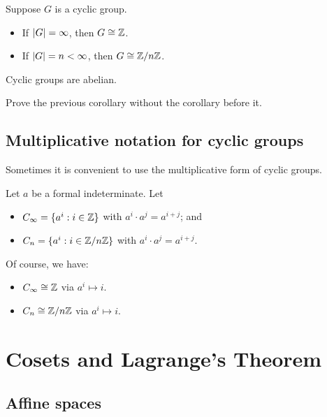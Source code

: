\documentclass[12pt,letterpaper]{report}
\begin{document}
\begin{cor}{}{}
  Suppose $G$ is a cyclic group.
  \begin{itemize}
    \item If $\lvert G\rvert = \infty$, then $G \cong \mathbb{Z}$.
    \item If $\lvert G\rvert = n < \infty$, then $G \cong \mathbb{Z}/{n}\mathbb{Z}$.
  \end{itemize}
\end{cor}

\begin{cor}{}{}
  Cyclic groups are abelian.
\end{cor}

\begin{exer}{}{}
  Prove the previous corollary without the corollary before it.
\end{exer}

\pagebreak
\subsection{Multiplicative notation for cyclic groups}

Sometimes it is convenient to use the multiplicative form of cyclic groups.

\begin{defn}{}{}
  Let $a$ be a formal indeterminate.
  Let
  \begin{itemize}
    \item $C_\infty = \{a^i : i \in \mathbb{Z}\}$ with $a^i \cdot a^j = a^{i + j}$; and
    \item $C_n = \{a^i : i \in \mathbb{Z}/{n}\mathbb{Z}\}$ with $a^i \cdot a^j = a^{i + j}$.
  \end{itemize}
\end{defn}

Of course, we have:
\begin{itemize}
  \item $C_\infty \cong \mathbb{Z}$ via $a^i \mapsto i$.
  \item $C_n \cong \mathbb{Z}/{n}\mathbb{Z}$ via $a^i \mapsto i$.
\end{itemize}


\section{Cosets and Lagrange's Theorem}

\subsection{Affine spaces}
\end{document}
